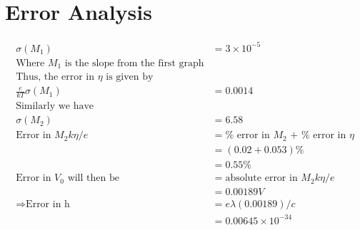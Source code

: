 \section{Error Analysis}
	\begin{align*}
		\sigma (M_1) 	&= 3\times 10^{-5} \\
		\text{Where $M_1$ is the slope from the first graph} \\
		\text{Thus, the error in $\eta$ is given by} \\
		\frac {e}{kT} \sigma (M_1) &= 0.0014\\
		\text{Similarly we have}\\
		\sigma (M_2) 	&= 6.58 \\
		\text{Error in $M_2 k \eta / e$} 
						&= \text{$\%$ error in $M_2$ + $\%$ error in $\eta$}\\
						&=(0.02 + 0.053) \%\\
						&=0.55\%\\
		\text{Error in $V_0$ will then be} 
						&= \text{absolute error in $M_2k\eta/e$}\\
						&=0.00189 V\\
		\Rightarrow \text{Error in h} 
						&= e\lambda (0.00189)/c\\
						&= 0.00645\times10^{-34}
	\end{align*}

